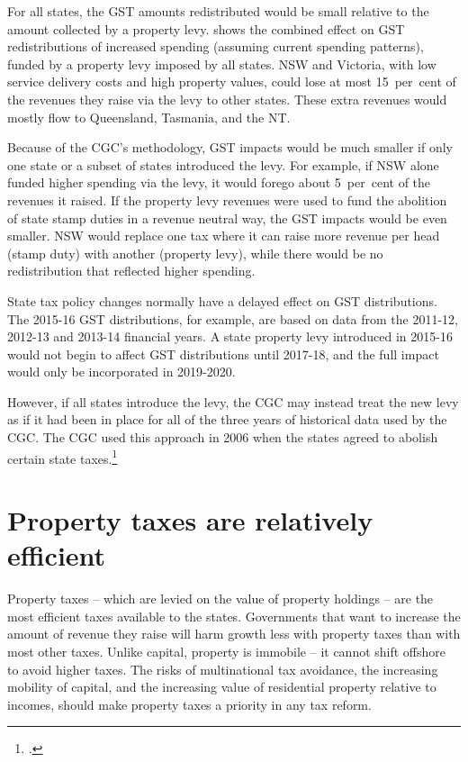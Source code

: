 \documentclass[twoside,english]{palatinob5ona4portrait}
\begin{document}
For all states, the GST amounts redistributed would be small relative to the amount collected by a property levy.  shows the combined effect on GST redistributions of increased spending (assuming current spending patterns), funded by a property levy imposed by all states. NSW and Victoria, with low service delivery costs and high property values, could lose at most 15~per~cent of the revenues they raise via the levy to other states. These extra revenues would mostly flow to Queensland, Tasmania, and the NT\@.



Because of the CGC’s methodology, GST impacts would be much smaller if only one state or a subset of states introduced the levy. For example, if NSW alone funded higher spending via the levy, it would forego about 5~per~cent of the revenues it raised. If the property levy revenues were used to fund the abolition of state stamp duties in a revenue neutral way, the GST impacts would be even smaller. NSW would replace one tax where it can raise more revenue per head (stamp duty) with another (property levy), while there would be no redistribution that reflected higher spending.  

State tax policy changes normally have a delayed effect on GST distributions. The 2015-16 GST distributions, for example, are based on data from the 2011-12, 2012-13 and 2013-14 financial years. A state property levy introduced in 2015-16 would not begin to affect GST distributions until 2017-18, and the full impact would only be incorporated in 2019-2020. 

However, if all states introduce the levy, the CGC may instead treat the new levy as if it had been in place for all of the three years of historical data used by the CGC\@. The CGC used this approach in 2006 when the states agreed to abolish certain state taxes.\footcite[][23]{CGC2015-Volume2}  

\chapter{Property taxes are relatively efficient}
Property taxes – which are levied on the value of property holdings – are the most efficient taxes available to the states. Governments that want to increase the amount of revenue they raise will harm growth less with property taxes than with most other taxes. Unlike capital, property is immobile – it cannot shift offshore to avoid higher taxes. The risks of multinational tax avoidance, the increasing mobility of capital, and the increasing value of residential property relative to incomes, should make property taxes a priority in any tax reform. 
\enlargethispage{2\baselineskip}
\end{document}
